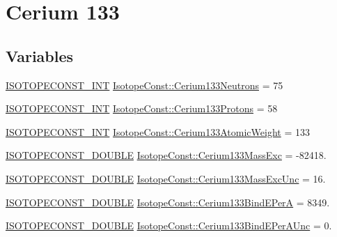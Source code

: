 \hypertarget{group___isotope_const-_cerium-_ce133}{}\section{Cerium 133}
\label{group___isotope_const-_cerium-_ce133}
\subsection*{Variables}
\begin{DoxyCompactItemize}
\item 
\mbox{\hyperlink{group___isotope_const-_macros_ga5f18360b3e99483a35c32d789e62621c}{I\+S\+O\+T\+O\+P\+E\+C\+O\+N\+S\+T\+\_\+\+I\+NT}} \mbox{\hyperlink{group___isotope_const-_cerium-_ce133_ga1921bc0a02567f678edab20d5b920046}{Isotope\+Const\+::\+Cerium133\+Neutrons}} = 75
\item 
\mbox{\hyperlink{group___isotope_const-_macros_ga5f18360b3e99483a35c32d789e62621c}{I\+S\+O\+T\+O\+P\+E\+C\+O\+N\+S\+T\+\_\+\+I\+NT}} \mbox{\hyperlink{group___isotope_const-_cerium-_ce133_ga7ab412da70cf908adf40b7d464cd802d}{Isotope\+Const\+::\+Cerium133\+Protons}} = 58
\item 
\mbox{\hyperlink{group___isotope_const-_macros_ga5f18360b3e99483a35c32d789e62621c}{I\+S\+O\+T\+O\+P\+E\+C\+O\+N\+S\+T\+\_\+\+I\+NT}} \mbox{\hyperlink{group___isotope_const-_cerium-_ce133_ga70c9b8c17f1bacbd322b272ec5a57dc6}{Isotope\+Const\+::\+Cerium133\+Atomic\+Weight}} = 133
\item 
\mbox{\hyperlink{group___isotope_const-_macros_ga8f45a7272ce02c0b4c65c44636ed719a}{I\+S\+O\+T\+O\+P\+E\+C\+O\+N\+S\+T\+\_\+\+D\+O\+U\+B\+LE}} \mbox{\hyperlink{group___isotope_const-_cerium-_ce133_gae8c05ad3cbd7e49a50dd89663f0ab944}{Isotope\+Const\+::\+Cerium133\+Mass\+Exc}} = -\/82418.
\item 
\mbox{\hyperlink{group___isotope_const-_macros_ga8f45a7272ce02c0b4c65c44636ed719a}{I\+S\+O\+T\+O\+P\+E\+C\+O\+N\+S\+T\+\_\+\+D\+O\+U\+B\+LE}} \mbox{\hyperlink{group___isotope_const-_cerium-_ce133_gaaf6c63dade458dfa8c8c46c078a31a65}{Isotope\+Const\+::\+Cerium133\+Mass\+Exc\+Unc}} = 16.
\item 
\mbox{\hyperlink{group___isotope_const-_macros_ga8f45a7272ce02c0b4c65c44636ed719a}{I\+S\+O\+T\+O\+P\+E\+C\+O\+N\+S\+T\+\_\+\+D\+O\+U\+B\+LE}} \mbox{\hyperlink{group___isotope_const-_cerium-_ce133_ga9e6119c4e99de974d2c783cd3f209dce}{Isotope\+Const\+::\+Cerium133\+Bind\+E\+PerA}} = 8349.
\item 
\mbox{\hyperlink{group___isotope_const-_macros_ga8f45a7272ce02c0b4c65c44636ed719a}{I\+S\+O\+T\+O\+P\+E\+C\+O\+N\+S\+T\+\_\+\+D\+O\+U\+B\+LE}} \mbox{\hyperlink{group___isotope_const-_cerium-_ce133_ga8faa581ab7c889dc02de685c4809c169}{Isotope\+Const\+::\+Cerium133\+Bind\+E\+Per\+A\+Unc}} = 0.

\end{DoxyCompactItemize}

